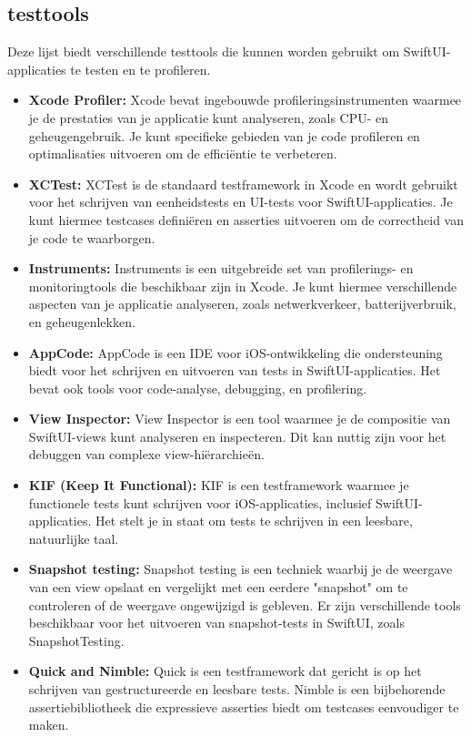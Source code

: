 \subsection{testtools}
Deze lijst biedt verschillende testtools die kunnen worden gebruikt om SwiftUI-applicaties te testen en te profileren.
\begin{itemize}
    \item {\textbf{Xcode Profiler:} Xcode bevat ingebouwde profileringsinstrumenten waarmee je de prestaties van je applicatie kunt analyseren, zoals CPU- en geheugengebruik. Je kunt specifieke gebieden van je code profileren en optimalisaties uitvoeren om de efficiëntie te verbeteren.}
    \item {\textbf{XCTest:} XCTest is de standaard testframework in Xcode en wordt gebruikt voor het schrijven van eenheidstests en UI-tests voor SwiftUI-applicaties. Je kunt hiermee testcases definiëren en asserties uitvoeren om de correctheid van je code te waarborgen.}
    \item {\textbf{Instruments:} Instruments is een uitgebreide set van profilerings- en monitoringtools die beschikbaar zijn in Xcode. Je kunt hiermee verschillende aspecten van je applicatie analyseren, zoals netwerkverkeer, batterijverbruik, en geheugenlekken.}
    \item {\textbf{AppCode:} AppCode is een IDE voor iOS-ontwikkeling die ondersteuning biedt voor het schrijven en uitvoeren van tests in SwiftUI-applicaties. Het bevat ook tools voor code-analyse, debugging, en profilering.}
    \item {\textbf{View Inspector:} View Inspector is een tool waarmee je de compositie van SwiftUI-views kunt analyseren en inspecteren. Dit kan nuttig zijn voor het debuggen van complexe view-hiërarchieën.}
    \item {\textbf{KIF (Keep It Functional):} KIF is een testframework waarmee je functionele tests kunt schrijven voor iOS-applicaties, inclusief SwiftUI-applicaties. Het stelt je in staat om tests te schrijven in een leesbare, natuurlijke taal.}
    \item {\textbf{Snapshot testing:} Snapshot testing is een techniek waarbij je de weergave van een view opslaat en vergelijkt met een eerdere "snapshot" om te controleren of de weergave ongewijzigd is gebleven. Er zijn verschillende tools beschikbaar voor het uitvoeren van snapshot-tests in SwiftUI, zoals SnapshotTesting.}
    \item {\textbf{Quick and Nimble:} Quick is een testframework dat gericht is op het schrijven van gestructureerde en leesbare tests. Nimble is een bijbehorende assertiebibliotheek die expressieve asserties biedt om testcases eenvoudiger te maken.}
\end{itemize}

